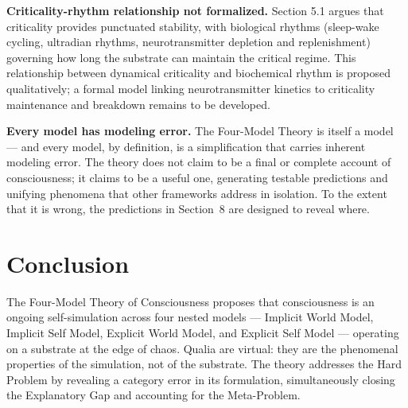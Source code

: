 \documentclass[12pt]{article}
\begin{document}
\textbf{Criticality-rhythm relationship not formalized.} Section 5.1 argues that criticality provides punctuated stability, with biological rhythms (sleep-wake cycling, ultradian rhythms, neurotransmitter depletion and replenishment) governing how long the substrate can maintain the critical regime. This relationship between dynamical criticality and biochemical rhythm is proposed qualitatively; a formal model linking neurotransmitter kinetics to criticality maintenance and breakdown remains to be developed.

\textbf{Every model has modeling error.} The Four-Model Theory is itself a model --- and every model, by definition, is a simplification that carries inherent modeling error. The theory does not claim to be a final or complete account of consciousness; it claims to be a useful one, generating testable predictions and unifying phenomena that other frameworks address in isolation. To the extent that it is wrong, the predictions in Section~8 are designed to reveal where.



\section{Conclusion}


The Four-Model Theory of Consciousness proposes that consciousness is an ongoing self-simulation across four nested models --- Implicit World Model, Implicit Self Model, Explicit World Model, and Explicit Self Model --- operating on a substrate at the edge of chaos. Qualia are virtual: they are the phenomenal properties of the simulation, not of the substrate. The theory addresses the Hard Problem by revealing a category error in its formulation, simultaneously closing the Explanatory Gap and accounting for the Meta-Problem.
\end{document}
